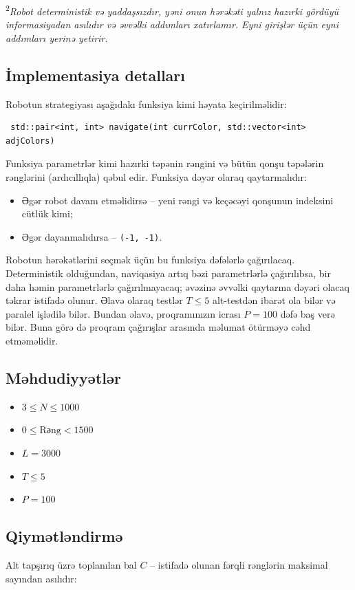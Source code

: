 \documentclass[12pt]{article}
\begin{document}
\textsuperscript{2}\textit{Robot deterministik və yaddaşsızdır, yəni onun hərəkəti yalnız hazırki gördüyü informasiyadan asılıdır və əvvəlki addımları xatırlamır. Eyni girişlər üçün eyni addımları yerinə yetirir.}

\subsection{İmplementasiya detalları}
Robotun strategiyası aşağıdakı funksiya kimi həyata keçirilməlidir:
\begin{lstlisting}
 std::pair<int, int> navigate(int currColor, std::vector<int> adjColors)
\end{lstlisting}

Funksiya parametrlər kimi hazırki təpənin rəngini və bütün qonşu təpələrin rənglərini (ardıcıllıqla) qəbul edir. Funksiya dəyər olaraq qaytarmalıdır:
\begin{itemize}
\item Əgər robot davam etməlidirsə – yeni rəngi və keçəcəyi qonşunun indeksini cütlük kimi;
\item Əgər dayanmalıdırsa – \texttt{(-1, -1)}.
\end{itemize}

Robotun hərəkətlərini seçmək üçün bu funksiya dəfələrlə çağırılacaq. Deterministik olduğundan, naviqasiya artıq bəzi parametrlərlə çağırılıbsa, bir daha həmin parametrlərlə çağırılmayacaq; əvəzinə əvvəlki qaytarma dəyəri olacaq
təkrar istifadə olunur. Əlavə olaraq testlər $T \leq 5$ alt-testdən ibarət ola bilər və paralel işlədilə bilər. Bundan əlavə, proqramınızın icrası $P = 100$ dəfə baş verə bilər. Buna görə də proqram çağırışlar arasında məlumat ötürməyə cəhd etməməlidir.

\subsection{Məhdudiyyətlər}
\begin{itemize}
\item $3 \leq N \leq 1000$
\item $0 \leq \text{Rəng} < 1500$
\item $L = 3000$
\item $T \leq 5$
\item $P = 100$
\end{itemize}

\subsection{Qiymətləndirmə}
Alt tapşırıq üzrə toplanılan bal $C$ – istifadə olunan fərqli rənglərin maksimal sayından asılıdır:
\end{document}
